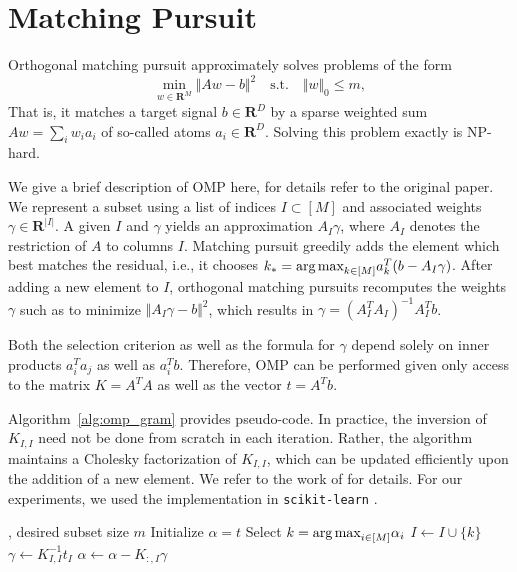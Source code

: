 \documentclass{article}
\newcommand{\R}{\mathbf{R}}
\theoremstyle{plain}
\theoremstyle{definition}
\theoremstyle{remark}
\begin{document}
\newpage
\appendix


\section{Matching Pursuit}
\label{app:matching_pursuit}

Orthogonal matching pursuit \citep{mallat1993matching} approximately solves problems of the form
\begin{equation}
    \label{eq:omp_problem_general}
    \min_{w\in\R^{M}} \Vert Aw - b\Vert^2 \quad\text{s.t.}\quad \Vert w \Vert_0 \leq m,
\end{equation}
That is, it matches a target signal $b\in \R^D$ by a sparse weighted sum $Aw = \sum_i w_i a_i$ of so-called atoms $a_i\in \R^D$.
Solving this problem exactly is NP-hard.

We give a brief description of OMP here, for details refer to the original paper.
We represent a subset using a list of indices $I\subset [M]$ and associated weights $\gamma \in \R^{\vert I \vert}$.
A given $I$ and $\gamma$ yields an approximation $A_I\gamma$, where $A_I$ denotes the restriction of $A$ to columns $I$.
Matching pursuit greedily adds the element which best matches the residual, i.e., it chooses $k_\ast = \text{arg\,max}_{k \in [M]} a_k^T (b - A_I\gamma)$.
After adding a new element to $I$, orthogonal matching pursuits recomputes the weights $\gamma$ such as to minimize $\Vert A_I\gamma - b\Vert^2$, which results in $\gamma = (A_I^TA_I)^{-1} A_I^T b$.

Both the selection criterion as well as the formula for $\gamma$ depend solely on inner products $a_i^Ta_j$ as well as $a_i^Tb$.
Therefore, OMP can be performed given only access to the matrix $K = A^TA$ as well as the vector $t=A^Tb$.

Algorithm~\ref{alg:omp_gram} provides pseudo-code.
In practice, the inversion of $K_{I, I}$ need not be done from scratch in each iteration.
Rather, the algorithm maintains a Cholesky factorization of $K_{I,I}$, which can be updated efficiently upon the addition of a new element.
We refer to the work of \citet{rubinstein2008efficient} for details.
For our experiments, we used the implementation in \texttt{scikit-learn} \citep{scikit-learn}.

\begin{algorithm}[H]
  \caption{Orthogonal Matching Pursuit (Gram variant)}
  \label{alg:omp_gram}
\begin{algorithmic}
  \INPUT{$K\in\R^{M\times M}$, $t\in\R^{M}$}, desired subset size $m$
  \STATE Initialize $\alpha = t$
  \STATE Select $k=\text{arg\,max}_{i\in [M]} \alpha_i$
  \STATE $I\gets I \cup \{k\}$
  \STATE $\gamma \gets K_{I,I}^{-1}t_I$
  \STATE $\alpha \gets \alpha - K_{:,I}\gamma$
  \ENDWHILE
\end{algorithmic}
\end{algorithm}
\end{document}
